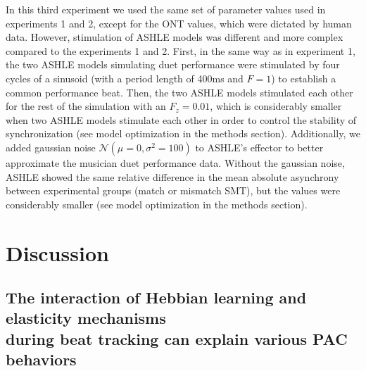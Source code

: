 \documentclass{report}
\begin{document}
In this third experiment we used the same set of parameter values used in experiments 1 and 2, except for the ONT values, which were dictated by human data. However, stimulation of ASHLE models was different and more complex compared to the experiments 1 and 2. First, in the same way as in experiment 1, the two ASHLE models simulating duet performance were stimulated by four cycles of a sinusoid (with a period length of 400ms and $F = 1$) to establish a common performance beat. Then, the two ASHLE models stimulated each other for the rest of the simulation with an $F_z = 0.01$, which is considerably smaller when two ASHLE models stimulate each other in order to control the stability of synchronization (see model optimization in the methods section). Additionally, we added gaussian noise $\mathcal{N}(\mu=0, \sigma^2=100)$ to ASHLE's effector to better approximate the musician duet performance data. Without the gaussian noise, ASHLE showed the same relative difference in the mean absolute asynchrony between experimental groups (match or mismatch SMT), but the values were considerably smaller (see  model optimization in the methods section).

\section{Discussion}

\subsection{The interaction of Hebbian learning and elasticity mechanisms \\ during beat tracking can explain various PAC behaviors}
\end{document}
